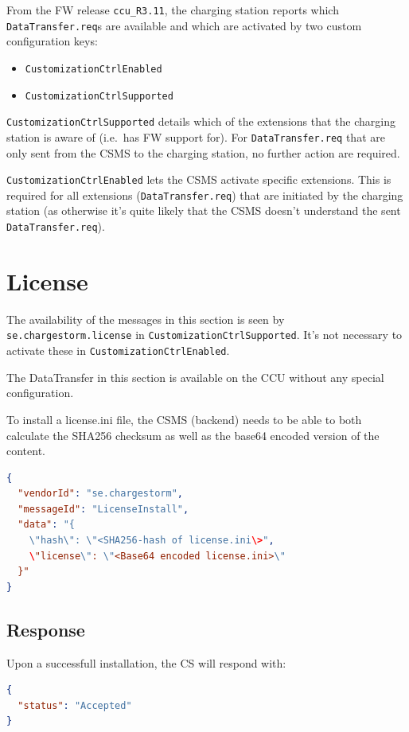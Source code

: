 \documentclass{scrartcl}
\begin{document}
From the FW release \verb|ccu_R3.11|, the charging station reports which
\verb|DataTransfer.req|s are available and which are activated by two custom
configuration keys:
\begin{itemize}
\item \verb|CustomizationCtrlEnabled|
\item \verb|CustomizationCtrlSupported|
\end{itemize}

\verb|CustomizationCtrlSupported| details which of the extensions that the
charging station is aware of (i.e.\ has FW support for). For
\verb|DataTransfer.req| that are only sent from the CSMS to the charging
station, no further action are required.

\verb|CustomizationCtrlEnabled| lets the CSMS activate specific
extensions. This is required for all extensions (\verb|DataTransfer.req|) that
are initiated by the charging station (as otherwise it's quite likely that the
CSMS doesn't understand the sent \verb|DataTransfer.req|).


\newpage
\section{License}
\label{sec:license}

The availability of the messages in this section is seen by
\verb|se.chargestorm.license| in \verb|CustomizationCtrlSupported|. It's not
necessary to activate these in \verb|CustomizationCtrlEnabled|.

The DataTransfer in this section is available on the CCU without any special
configuration.

To install a license.ini file, the CSMS (backend) needs to be able to both
calculate the SHA256 checksum as well as the base64 encoded version of the
content.

\begin{lstlisting}[language=json,caption={DataTransfer.req for LicenseInstall
sent to the CS},captionpos=t]
{
  "vendorId": "se.chargestorm",
  "messageId": "LicenseInstall",
  "data": "{
    \"hash\": \"<SHA256-hash of license.ini\>",
    \"license\": \"<Base64 encoded license.ini>\"
  }"
}
\end{lstlisting}


\subsection{Response}
\label{sec:response}

Upon a successfull installation, the CS will respond with:
\begin{lstlisting}[language=json,caption={DataTransfer.conf for LicenseInstall
sent from the CS},captionpos=t]
{
  "status": "Accepted"
}
\end{lstlisting}
\end{document}
